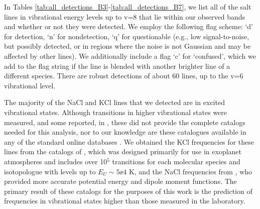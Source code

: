 \documentclass[12pt]{article}
\begin{document}
In Tables \ref{tab:all_detections_B3}-\ref{tab:all_detections_B7}, we list all
of the salt lines in vibrational energy levels up to v=8 that lie within our
observed bands and whether or not they were detected.  We employ the following
flag scheme: `d' for detection, `n' for nondetection, `q' for questionable
(e.g., low signal-to-noise, but possibly detected, or in regions where the
noise is not Gaussian and may be affected by other lines).  We additionally
include a flag `c' for `confused', which we add to the flag string if the line
is blended with another brighter line of a different species.  There are robust
detections of about 60 lines, up to the v=6 vibrational level.

The majority of the NaCl and KCl lines that we detected are in excited
vibrational states.  Although transitions in higher vibrational states were
measured, and some reported, in \cite{Caris2004a}, these did not provide the
complete catalogs needed for this analysis, nor to our knowledge are these
catalogues available in any of the standard online databases \cite[i.e., CDMS,
SLAIM, JPL;][]{Muller2005a,Lovas2005b,Pickett1998a}.  We obtained the KCl
frequencies for these lines from the catalogs of \cite{Barton2014a}, which was
designed primarily for use in exoplanet atmospheres and includes over 10$^5$
transitions for each molecular species and isotopologue with levels up to
$E_U\sim5\ee{4}$ K, and the NaCl frequencies from \cite{Cabezas2016a}, who
provided more accurate potential energy and dipole moment functions. The
primary result of these catalogs for the purposes of this work is the
prediction of frequencies in vibrational states higher than those measured in
the laboratory. 


\end{document}
